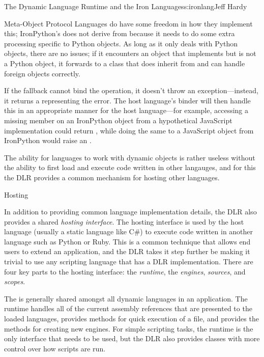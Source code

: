\begin{aosachapter}{The Dynamic Language Runtime and the Iron Languages}{s:ironlang}{Jeff Hardy}
\begin{aosasect1}{Meta-Object Protocol}
Languages do have some freedom in how they implement this; IronPython's
 does not derive from  because it
needs to do some extra processing specific to Python objects. As long as it
only deals with Python objects, there are no issues; if it encounters an object
that implements  but is not a Python object,
it forwards to a  class that does inherit from
 and can handle foreign objects correctly.

If the fallback cannot bind the operation, it doesn't throw an
exception---instead, it returns a  representing the
error. The host language's binder will then handle this in an appropriate
manner for the host language---for example, accessing a missing member on an
IronPython object from a hypothetical JavaScript implementation could return
, while doing the same to a JavaScript object from IronPython
would raise an .

The ability for languages to work with dynamic objects is rather useless
without the ability to first load and execute code written in other langauges,
and for this the DLR provides a common mechanism for hosting other languages.

\end{aosasect1}

\begin{aosasect1}{Hosting}

In addition to providing common language implementation details, the DLR also
provides a shared \emph{hosting interface}. The hosting interface is used by
the host language (usually a static language like C\#) to execute code written
in another language such as Python or Ruby. This is a common technique that
allows end users to extend an application, and the DLR takes it step further be
making it trivial to use any scripting language that has a DLR implementation.
There are four key parts to the hosting interface: the \emph{runtime}, the
\emph{engines}, \emph{sources},  and \emph{scopes}.

The  is generally shared amongst all dynamic languages in
an application. The runtime handles all of the current assembly references that
are presented to the loaded languages, provides methods for quick execution of
a file, and provides the methods for creating new engines. For simple scripting
tasks, the runtime is the only interface that needs to be used, but the DLR
also provides classes with more control over how scripts are run.


\end{aosasect1}
\end{aosachapter}
